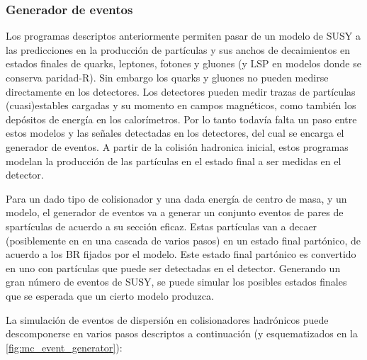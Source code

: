 

\subsubsection{Generador de eventos}

Los programas descriptos anteriormente permiten pasar de un modelo de SUSY a las
predicciones en la producción de partículas y sus anchos de decaimientos en
estados finales de quarks, leptones, fotones y gluones (y LSP en modelos donde
se conserva paridad-R). Sin embargo los quarks y gluones no pueden medirse
directamente en los detectores. Los detectores pueden medir trazas de partículas
(cuasi)estables cargadas y su momento en campos magnéticos, como también los
depósitos de energía en los calorímetros. Por lo tanto todavía falta un paso
entre estos modelos y las señales detectadas en los detectores, del cual se
encarga el generador de eventos. A partir de la colisión hadronica inicial,
estos programas modelan la producción de las partículas en el estado final a ser
medidas en el detector.

Para un dado tipo de colisionador y una dada energía de centro de masa, y un
modelo, el generador de eventos va a generar un conjunto eventos de pares de
spartículas de acuerdo a su sección eficaz. Estas partículas van a decaer
(posiblemente en en una cascada de varios pasos) en un estado final partónico,
de acuerdo a los BR fijados por el modelo. Este estado final partónico es
convertido en uno con partículas que puede ser detectadas en el detector.
Generando un gran número de eventos de SUSY, se puede simular los posibles
estados finales que se esperada que un cierto modelo produzca.


La simulación de eventos de dispersión en colisionadores hadrónicos puede
descomponerse en varios pasos descriptos a continuación (y esquematizados en la
\cref{fig:mc_event_generator}):

